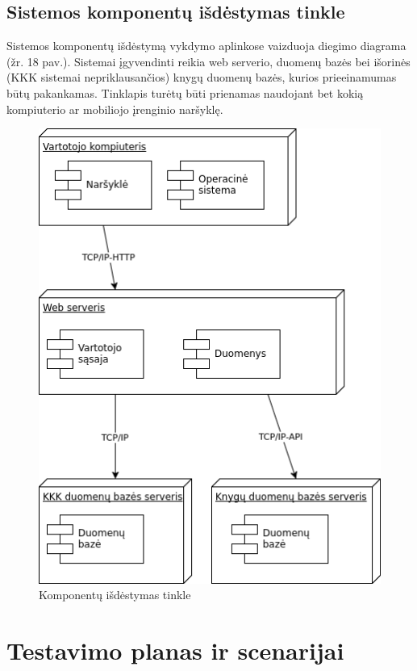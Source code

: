 \documentclass{VUMIFPSkursinis}
\begin{document}
	\subsection{Sistemos komponentų išdėstymas tinkle}
		Sistemos komponentų išdėstymą vykdymo aplinkose vaizduoja diegimo diagrama (žr. 18 pav.).
		Sistemai įgyvendinti reikia web serverio, duomenų bazės bei išorinės (KKK sistemai nepriklausančios) 
		knygų duomenų bazės, kurios prieeinamumas būtų pakankamas.
		Tinklapis turėtų būti prienamas naudojant bet kokią kompiuterio ar mobiliojo įrenginio naršyklę.
		\begin{figure}[H]
			\centering
			\includegraphics[scale=0.9]{img/Deployment.png}
			\caption{Komponentų išdėstymas tinkle}
			\label{img:psi2-deployment}
		\end{figure}

\section{Testavimo planas ir scenarijai}
\end{document}
